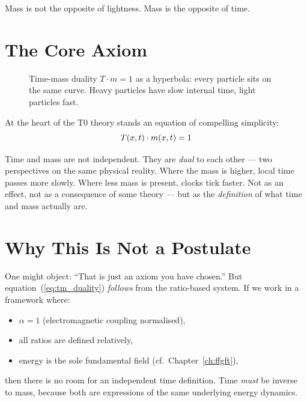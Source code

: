 \epigraph{Mass is not the opposite of lightness. Mass is the opposite of time.}{}

\section{The Core Axiom}


\begin{figure}[ht]
\centering
{}
\caption{Time-mass duality $T \cdot m = 1$ as a hyperbola: every particle sits on the same curve. Heavy particles have slow internal time, light particles fast.}
\label{fig:tm_duality}
\end{figure}
At the heart of the T0 theory stands an equation of compelling simplicity:
\begin{equation}
T(x,t) \cdot m(x,t) = 1
\label{eq:tm_duality}
\end{equation}

Time and mass are not independent. They are \emph{dual} to each other --- two perspectives on the same physical reality. Where the mass is higher, local time passes more slowly. Where less mass is present, clocks tick faster. Not as an effect, not as a consequence of some theory --- but as the \emph{definition} of what time and mass actually are.

\section{Why This Is Not a Postulate}

One might object: ``That is just an axiom you have chosen.'' But equation~(\ref{eq:tm_duality}) \emph{follows} from the ratio-based system. If we work in a framework where:
\begin{itemize}
\item $\alpha = 1$ (electromagnetic coupling normalised),
\item all ratios are defined relatively,
\item energy is the sole fundamental field (cf.\ Chapter~\ref{ch:ffgft}),
\end{itemize}
then there is no room for an independent time definition. Time \emph{must} be inverse to mass, because both are expressions of the same underlying energy dynamics.


